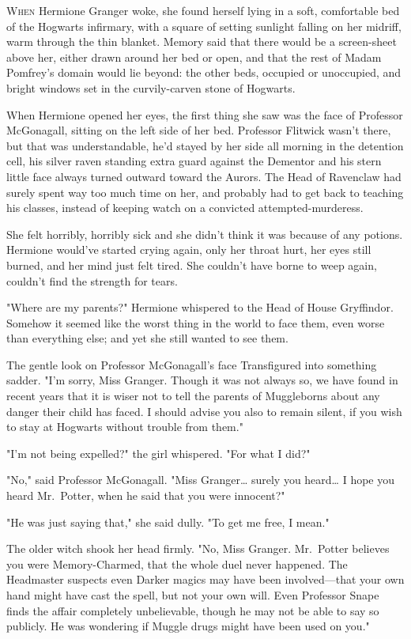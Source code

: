 
\lettrine{W}{hen} Hermione
Granger woke, she found herself lying in a soft, comfortable bed of the
Hogwarts infirmary, with a square of setting sunlight falling on her midriff,
warm through the thin blanket. Memory said that there would be a screen-sheet
above her, either drawn around her bed or open, and that the rest of Madam
Pomfrey's domain would lie beyond: the other beds, occupied or unoccupied, and
bright windows set in the curvily-carven stone of Hogwarts.

When Hermione opened her eyes, the first thing she saw was the face of
Professor McGonagall, sitting on the left side of her bed. Professor Flitwick
wasn't there, but that was understandable, he'd stayed by her side all morning
in the detention cell, his silver raven standing extra guard against the
Dementor and his stern little face always turned outward toward the Aurors. The
Head of Ravenclaw had surely spent way too much time on her, and probably had
to get back to teaching his classes, instead of keeping watch on a convicted
attempted-murderess.

She felt horribly, horribly sick and she didn't think it was because of any
potions. Hermione would've started crying again, only her throat hurt, her eyes
still burned, and her mind just felt tired. She couldn't have borne to weep
again, couldn't find the strength for tears.

"Where are my parents?" Hermione whispered to the Head of House Gryffindor.
Somehow it seemed like the worst thing in the world to face them, even worse
than everything else; and yet she still wanted to see them.

The gentle look on Professor McGonagall's face Transfigured into something
sadder. "I'm sorry, Miss Granger. Though it was not always so, we have found in
recent years that it is wiser not to tell the parents of Muggleborns about any
danger their child has faced. I should advise you also to remain silent, if you
wish to stay at Hogwarts without trouble from them."

"I'm not being expelled?" the girl whispered. "For what I did?"

"No," said Professor McGonagall. "Miss Granger{\ldots} surely you heard{\ldots}
I hope you heard Mr.~Potter, when he said that you were innocent?"

"He was just saying that," she said dully. "To get me free, I mean."

The older witch shook her head firmly. "No, Miss Granger. Mr.~Potter believes
you were Memory-Charmed, that the whole duel never happened. The Headmaster
suspects even Darker magics may have been involved---that your own hand might
have cast the spell, but not your own will. Even Professor Snape finds the
affair completely unbelievable, though he may not be able to say so publicly.
He was wondering if Muggle drugs might have been used on you."

